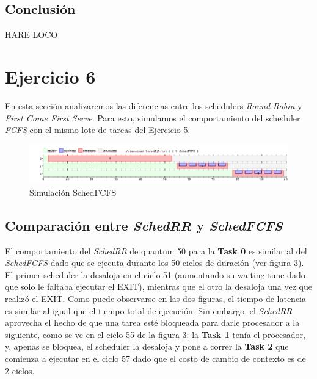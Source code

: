 \documentclass[11pt]{article}
\begin{document}
  \subsection{Conclusión}
  HARE LOCO

  \newpage

  \section{Ejercicio 6}

  En esta sección analizaremos las diferencias entre los schedulers \textit{Round-Robin} y \textit{First Come First Serve}. Para esto, simulamos el comportamiento del scheduler \textit{FCFS} con el mismo lote de tareas del Ejercicio 5.

        \begin{figure}[H]
          \includegraphics[scale=0.5]{Ej6}
          \caption{Simulación SchedFCFS}
        \end{figure}

  \subsection{Comparación entre \textit{SchedRR} y \textit{SchedFCFS}}

  El comportamiento del \textit{SchedRR} de quantum 50 para la \textbf{Task 0} es similar al del \textit{SchedFCFS} dado que se ejecuta durante los 50 ciclos de duración (ver figura 3). El primer scheduler la desaloja en el ciclo 51 (aumentando su waiting time dado que solo le faltaba ejecutar el EXIT), mientras que el otro la desaloja una vez que realizó el EXIT. Como puede observarse en las dos figuras, el tiempo de latencia es similar al igual que el tiempo total de ejecución. Sin embargo, el \textit{SchedRR} aprovecha el hecho de que una tarea esté bloqueada para darle procesador a la siguiente, como se ve en el ciclo 55 de la figura 3: la \textbf{Task 1} tenía el procesador, y, apenas se bloquea, el scheduler la desaloja y pone a correr la \textbf{Task 2} que comienza a ejecutar en el ciclo 57 dado que el costo de cambio de contexto es de 2 ciclos. \\
\end{document}

